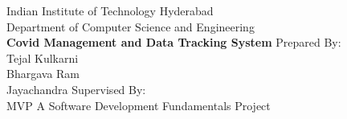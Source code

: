 \documentclass[12pt,a4paper]{report}
\def \UNIVERSITY {Indian Institute of Technology Hyderabad}
\def \DEPARTEMENT {Department of Computer Science and Engineering}
\def \PROJECTTITLE {Covid Management and Data Tracking System}
\def \STUDENTA {Tejal Kulkarni}
\def \STUDENTB {Bhargava Ram}
\def \STUDENTC {Jayachandra}
\def \SUPERVISOR {MVP}
\begin{document}
\setlength{\parindent}{0em}
\setlength{\parskip}{0.5em}


\begin{titlepage}
    \vfill
    \begin{center}
        \fontsize{14pt}{14pt}\selectfont
        \vfill
        \UNIVERSITY \\
        \DEPARTEMENT \\
        \vfill
        \fontsize{18pt}{18pt}\selectfont
        \textbf{\PROJECTTITLE}
        \vfill
        \fontsize{14pt}{14pt}\selectfont
        Prepared By: \\
        \STUDENTA \\
        \STUDENTB \\
        \STUDENTC
        \vfill
        Supervised By: \\
        \SUPERVISOR
        \vfill
        A Software Development Fundamentals Project
        \vfill
      \end{center}
\end{titlepage}

\dominitoc






\cleardoublepage

\setlength{\parindent}{0em}
\setlength{\parskip}{0.5em}


%

%

%

%



%

%
%
\end{document}
